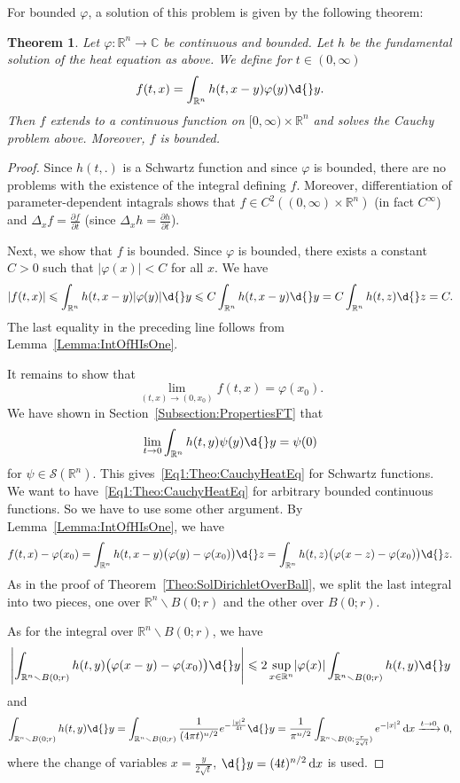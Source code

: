 \documentclass[12pt, oneside, a4paper]{article}
\newtheorem{thm}{Theorem}[section]
\theoremstyle{dfn}
\def \S {\ensuremath{\mathcal{S}}}
\def \S {\ensuremath{\mathcal{S}}}
\def\Rbb{\ensuremath{\mathbb{R}}}
\def\dx{\,\mathrm dx}
\newcommand{\Com}{\mathbb{C}}
\providecommand{\abs}[1]{\lvert#1\rvert}
\providecommand{\Abs}[1]{\left\lvert#1\right\rvert}
\begin{document}
For bounded $\varphi$, a solution of this problem is given by the following theorem:

\begin{thm}\label{Theo:SolHomCauchyForHeatEq}
Let $\varphi \colon \Rbb^n \to \Com$ be continuous and bounded. Let $h$ be the fundamental solution of the heat equation as above. We define for $t \in (0,\infty)$
\[
f(t,x) = \int_{\Rbb^n} h(t,x-y) \varphi(y) \d{}y.
\]
Then $f$ extends to a continuous function on $[0,\infty) \times \Rbb^n$ and solves the Cauchy problem above. Moreover, $f$ is bounded.
\end{thm}

\begin{proof}
Since $h(t,.)$ is a Schwartz function and since $\varphi$ is bounded, there are no problems with the existence of the integral defining $f$. Moreover, differentiation of parameter-dependent intagrals shows that $f \in C^2((0,\infty)\times \Rbb^n)$ (in fact $C^\infty$) and $\Delta_x f = \frac{\partial f}{\partial t}$ (since $\Delta_x h = \frac{\partial h}{\partial t}$).

Next, we show that $f$ is bounded. Since $\varphi$ is bounded, there exists a constant $C > 0$ such that $\abs{\varphi(x)} < C$ for all $x$. We have
\[
\abs{f(t,x)}
\leqslant
\int_{\Rbb^n} h(t, x-y) \abs{\varphi(y)} \d{}y
\leqslant
C \int_{\Rbb^n} h(t, x-y) \d{}y
=
C \int_{\Rbb^n} h(t, z) \d{}z
= C.
\]
The last equality in the preceding line follows from Lemma~\ref{Lemma:IntOfHIsOne}.

It remains to show that
\begin{equation}\label{Eq1:Theo:CauchyHeatEq}
\lim_{(t,x) \to (0,x_0)} f(t,x) = \varphi(x_0).
\end{equation}
We have shown in Section~\ref{Subsection:PropertiesFT} that
\[
\lim_{t \to 0} \int_{\Rbb^n} h(t,y) \psi(y) \d{}y = \psi(0)
\]
for $\psi \in \S(\Rbb^n)$. This gives~\eqref{Eq1:Theo:CauchyHeatEq} for Schwartz functions. We want to have~\eqref{Eq1:Theo:CauchyHeatEq} for arbitrary bounded continuous functions. So we have to use some other argument. By Lemma~\ref{Lemma:IntOfHIsOne}, we have
\[
f(t,x) - \varphi(x_0)
= \int_{\Rbb^n} h(t,x-y) \big( \varphi(y) - \varphi(x_0) \big) \d{}z
= \int_{\Rbb^n} h(t,z) \big( \varphi(x-z) - \varphi(x_0) \big) \d{}z.
\]
As in the proof of Theorem~\ref{Theo:SolDirichletOverBall}, we split the last integral into two pieces, one over $\Rbb^n \smallsetminus B(0;r)$ and the other over $B(0;r)$.

As for the integral over $\Rbb^n \smallsetminus B(0;r)$, we have
\[
\Abs{\int_{\Rbb^n \smallsetminus B(0;r)} h(t,y) \big( \varphi(x-y) - \varphi(x_0) \big) \d{}y}
\leqslant
2 \sup_{x \in \Rbb^n} \abs{\varphi(x)} \int_{\Rbb^n \smallsetminus B(0;r)} h(t,y) \d{}y
\]
and
\[
\int_{\Rbb^n \smallsetminus B(0;r)} h(t,y) \d{}y
= \int_{\Rbb^n \smallsetminus B(0;r)} \frac{1}{(4\pi t)^{n/2}} e^{-\frac{\abs{y}^2}{4t}} \d{}y
= \frac{1}{\pi^{n/2}} \int_{\Rbb^n \smallsetminus B(0; \frac{r}{2\sqrt{t}})} e^{-\abs{x}^2} \dx
\xrightarrow{t \to 0} 0,
\]
where the change of variables $x = \frac{y}{2\sqrt{t}}$, $\d{}y = (4t)^{n/2} \dx$ is used.


\end{proof}
\end{document}
